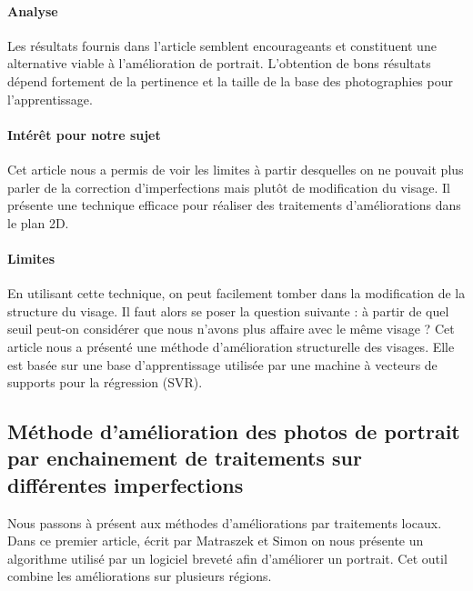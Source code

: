 \documentclass[11pt, french,screen]{report-rd-info}
\begin{document}
\paragraph{Analyse}
Les résultats fournis dans l’article semblent encourageants et constituent une alternative viable à l’amélioration de portrait. L’obtention de bons résultats dépend fortement de la pertinence et la taille de la base des photographies pour l’apprentissage.
\paragraph{Intérêt pour notre sujet}
Cet article nous a permis de voir les limites à partir desquelles on ne pouvait plus parler de la correction d’imperfections mais plutôt de modification du visage. Il présente une technique efficace pour réaliser des traitements d’améliorations dans le plan 2D.
\paragraph{Limites}
En utilisant cette technique, on peut facilement tomber dans la modification de la structure du visage. Il faut alors se poser la question suivante : à partir de quel seuil peut-on considérer que nous n’avons plus affaire avec le même visage ?
Cet article nous a présenté une méthode d’amélioration structurelle des visages. Elle est basée sur une base d’apprentissage utilisée par une machine à vecteurs de supports pour la régression (SVR).
\subsection{Méthode d’amélioration des photos de portrait par enchainement de traitements sur différentes imperfections}
Nous passons à présent aux méthodes d’améliorations par traitements locaux. Dans ce premier article, écrit par Matraszek et Simon\cite{Matraszek2004} on nous présente un algorithme utilisé par un logiciel breveté afin d'améliorer un portrait. Cet outil combine les améliorations sur plusieurs régions.
\end{document}
